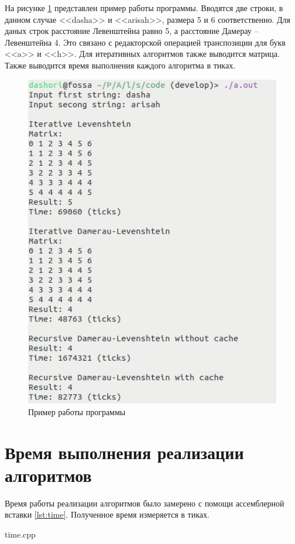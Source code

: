 На рисунке \ref{img:example} представлен пример работы программы. Вводятся две строки, в данном случае <<dasha>> и <<arisah>>, размера 5 и 6 соответственно. Для даных строк расстояние Левенштейна равно 5, а расстояние Дамерау -- Левенштейна 4. Это связано с редакторской операцией транспозиции для букв <<a>> и <<h>>. Для итеративных алгоритмов также выводится матрица. Также выводится время выполнения каждого алгоритма в тиках.
\pagebreak 
\begin{figure}[h]
	\centering
	\includegraphics[width=130mm]{example}
	\caption{Пример работы программы}
	\label{img:example}
\end{figure}

\section{Время выполнения реализации алгоритмов}

Время работы реализации алгоритмов было замерено с помощи ассемблерной вставки \ref{lst:time}. Полученное время измеряется в тиках.
\pagebreak
\begin{lstinputlisting}[
	caption={Ассемблерная вставка},
	label={lst:time}
	]{time.cpp}
\end{lstinputlisting}

